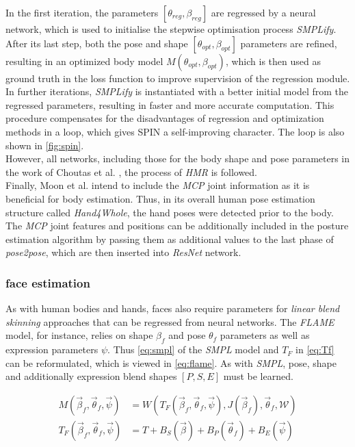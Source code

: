 In the first iteration, the parameters $[\theta_{reg},\beta_{reg}]$ are regressed by a neural network, which is used to initialise the stepwise optimisation process \emph{SMPLify}. After its last step, both the pose and shape $[\theta_{opt},\beta_{opt}]$ parameters are refined, resulting in an optimized body model $M(\theta_{opt},\beta_{opt})$, which is then used as ground truth in the loss function to improve supervision of the regression module. In further iterations, \emph{SMPLify} is instantiated with a better initial model from the regressed parameters, resulting in faster and more accurate computation. This procedure compensates for the disadvantages of regression and optimization methods in a loop, which gives SPIN a self-improving character. The loop is also shown in \autoref{fig:spin}.\\
However, all networks, including those for the body shape and pose parameters in the work of Choutas et al. \cite{expose}, the process of \emph{HMR} is followed. \\
Finally, Moon et al. \cite{moon} intend to include the \emph{MCP} joint information as it is beneficial for body estimation. Thus, in its overall human pose estimation structure called \emph{Hand4Whole}, the hand poses were detected prior to the body. The \emph{MCP} joint features and positions can be additionally included in the posture estimation algorithm by passing them as additional values to the last phase of \emph{pose2pose}, which are then inserted into \emph{ResNet} network. \\

\subsubsection{face estimation}
As with human bodies and hands, faces also require parameters for \emph{linear blend skinning} approaches that can be regressed from neural networks. The \emph{FLAME} model, for instance, relies on shape $\beta_{f}$ and pose $\theta_{f}$ parameters as well as expression parameters  $\psi$. Thus \autoref{eq:smpl} of the \emph{SMPL} model and $T_{F}$ in \autoref{eq:Tf} can be reformulated, which is viewed in \autoref{eq:flame}. As with \emph{SMPL}, pose, shape and additionally expression blend shapes $[P,S,E]$ must be learned. \cite{flame}

\begin{equation}
\label{eq:flame}
\begin{split}
M(\vec{\beta}_{f},\vec{\theta}_{f}, \vec{\psi}) &= W(T_{F}(\vec{\beta}_{f},\vec{\theta}_{f}, \vec{\psi}),J(\vec{\beta}_{f}),\vec{\theta}_{f},\mathcal{W}) \\
T_{F}(\vec{\beta}_{f},\vec{\theta}_{f}, \vec{\psi}) &= T + B_{S}(\vec{\beta}) + B_{P}(\vec{\theta}_{f}) + B_{E} (\vec{\psi})
\end{split}
\end{equation}

